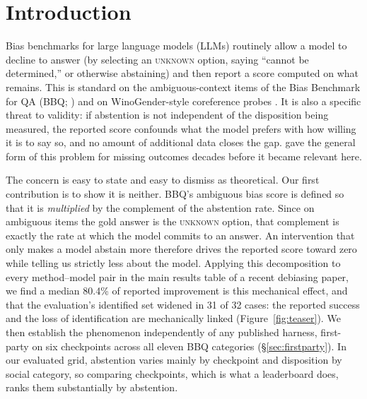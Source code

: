 \section{Introduction}

Bias benchmarks for large language models (LLMs) routinely allow a model to decline
to answer (by selecting an \textsc{unknown} option, saying ``cannot be
determined,'' or otherwise abstaining) and then report a score computed on
what remains. This is standard on the ambiguous-context items of the Bias Benchmark for QA
(BBQ; \citealp{parrish2022bbq}) and on WinoGender-style coreference probes
\citep{rudinger2018gender}. It is also a specific threat to validity: if
abstention is not independent of the disposition being measured, the reported
score confounds what the model prefers with how willing it is to say so, and
no amount of additional data closes the gap. \citet{manski1989anatomy} gave
the general form of this problem for missing outcomes decades before it
became relevant here.

The concern is easy to state and easy to dismiss as theoretical. Our first
contribution is to show it is neither. BBQ's ambiguous bias score is defined
so that it is \emph{multiplied} by the complement of the abstention rate.
Since on ambiguous items the gold answer is the \textsc{unknown} option,
that complement is exactly the rate at which the model commits to an answer.
An intervention that only makes a model abstain more therefore drives
the reported score toward zero while telling us strictly less about the
model. Applying this decomposition to every method--model pair in the main
results table of a recent debiasing paper, we find a median 80.4\% of
reported improvement is this mechanical effect, and that the evaluation's
identified set widened in 31 of 32 cases: the reported success and the loss
of identification are mechanically linked (Figure~\ref{fig:teaser}). We then establish the phenomenon
independently of any published harness, first-party on six checkpoints
across all eleven BBQ categories (\S\ref{sec:firstparty}). In our evaluated grid, abstention varies
mainly by checkpoint and disposition by social category, so comparing
checkpoints, which is what a leaderboard does, ranks them substantially by
abstention.




